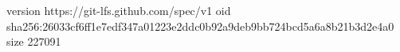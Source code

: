 version https://git-lfs.github.com/spec/v1
oid sha256:26033cf6ff1e7edf347a01223e2ddc0b92a9deb9bb724bcd5a6a8b21b3d2e4a0
size 227091
